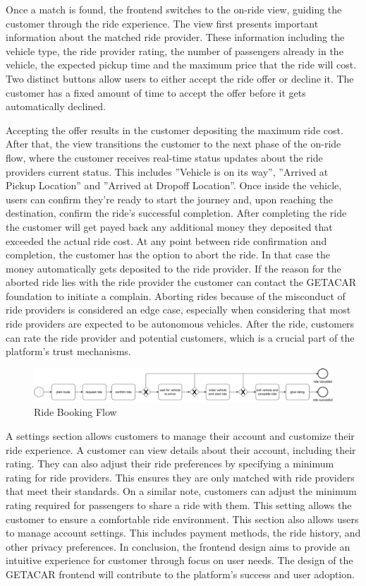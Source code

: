 Once a match is found, the frontend switches to the on-ride view, guiding the customer through the ride experience. The view first presents important information about the matched ride provider. These information including the vehicle type, the ride provider rating, the number of passengers already in the vehicle, the expected pickup time and the maximum price that the ride will cost. Two distinct buttons allow users to either accept the ride offer or decline it. The customer has a fixed amount of time to accept the offer before it gets automatically declined. 

Accepting the offer results in the customer depositing the maximum ride cost. After that, the view  transitions the customer to the next phase of the on-ride flow, where the customer receives real-time status updates about the ride providers current status. This includes ''Vehicle is on its way'', ''Arrived at Pickup Location'' and ''Arrived at Dropoff Location''. Once inside the vehicle, users can confirm they're ready to start the journey and, upon reaching the destination, confirm the ride's successful completion. After completing the ride the customer will get payed back any additional money they deposited that exceeded the actual ride cost. At any point between ride confirmation and completion, the customer has the option to abort the ride. In that case the money automatically gets deposited to the ride provider. If the reason for the aborted ride lies with the ride provider the customer can contact the GETACAR foundation to initiate a complain. Aborting rides because of the misconduct of ride providers is considered an edge case, especially when considering that most ride providers are expected to be autonomous vehicles.  After the ride, customers can rate the ride provider and potential customers, which is a crucial part of the platform's trust mechanisms.

\begin{figure}[h]
    \centering
    \includegraphics[width=\linewidth]{data/3.svg}
    \caption{Ride Booking Flow}
    \label{fig:directSVG}
\end{figure}

A settings section allows customers to manage their account and customize their ride experience. A customer can view details about their account, including their rating. They can also adjust their ride preferences by specifying a minimum rating for ride providers. This ensures they are only matched with ride providers that meet their standards. On a similar note, customers can adjust the minimum rating required for passengers to share a ride with them. This setting allows the customer to ensure a comfortable ride environment. This section also allows users to manage account settings. This includes payment methods, the ride history, and other privacy preferences. In conclusion, the frontend design aims to provide an intuitive experience for customer through focus on user needs. The design of the GETACAR frontend will contribute to the platform's success and user adoption.

